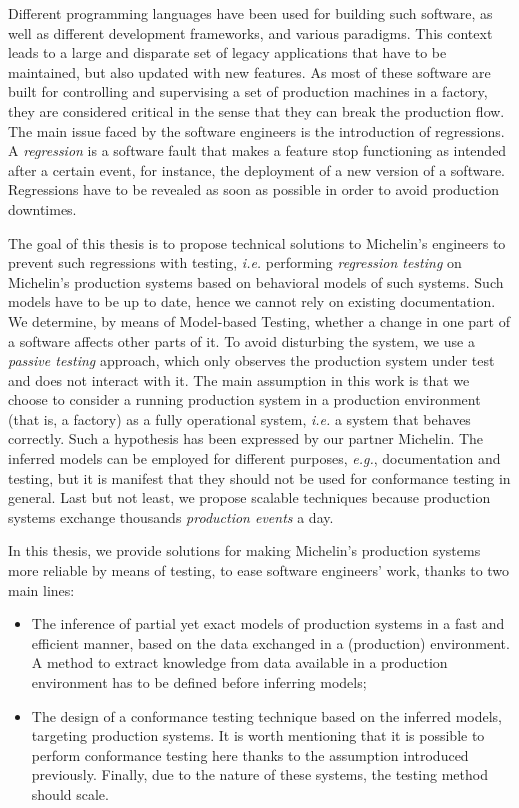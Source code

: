 Different programming languages have been used for building such
software, as well as different development frameworks, and
various paradigms. This context leads to a large and disparate
set of legacy applications that have to be maintained, but also
updated with new features. As most of these software are built
for controlling and supervising a set of production machines in a
factory, they are considered critical in the sense that they can
break the production flow. The main issue faced by the software
engineers is the introduction of regressions. A \emph{regression}
is a software fault that makes a feature stop functioning as
intended after a certain event, for instance, the deployment of a
new version of a software. Regressions have to be revealed as
soon as possible in order to avoid production downtimes.

The goal of this thesis is to propose technical solutions to
Michelin's engineers to prevent such regressions with testing,
\emph{i.e.} performing \emph{regression testing} on Michelin's
production systems based on behavioral models of such systems.
Such models have to be up to date, hence we cannot rely on
existing documentation.  We determine, by means of Model-based
Testing, whether a change in one part of a software affects other
parts of it. To avoid disturbing the system, we use a
\emph{passive testing} approach, which only observes the
production system under test and does not interact with it.  The
main assumption in this work is that we choose to consider a
running production system in a production environment (that is, a
factory) as a fully operational system, \emph{i.e.} a system that
behaves correctly.  Such a hypothesis has been expressed by our
partner Michelin. The inferred models can be employed for
different purposes, \emph{e.g.}, documentation and testing, but
it is manifest that they should not be used for conformance
testing in general. Last but not least, we propose scalable
techniques because production systems exchange thousands
\emph{production events} a day.

In this thesis, we provide solutions for making Michelin's
production systems more reliable by means of testing, to ease
software engineers' work, thanks to two main lines:

\begin{itemize}
    \item The inference of partial yet exact models of production
        systems in a fast and efficient manner, based on the data
        exchanged in a (production) environment. A method to
        extract knowledge from data available in a production
        environment has to be defined before inferring models;

    \item The design of a conformance testing technique based on
        the inferred models, targeting production systems. It is
        worth mentioning that it is possible to perform
        conformance testing here thanks to the assumption
        introduced previously. Finally, due to the nature of
        these systems, the testing method should scale.
\end{itemize}

